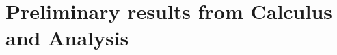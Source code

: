 \documentclass[../main.tex]{subfiles}
\begin{document}
\section{Preliminary results from Calculus and Analysis}\label{sec0}
%
\end{document}
